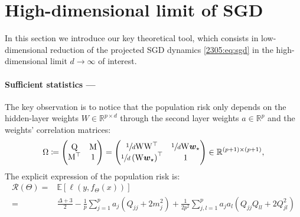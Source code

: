 \section{High-dimensional limit of SGD}

\label{2305:sec:odes}
In this section we introduce our key theoretical tool, which consists in low-dimensional reduction of the projected SGD dynamics \eqref{2305:eq:sgd} in the high-dimensional limit $d\to\infty$ of interest. 
\paragraph{Sufficient statistics ---} The key observation is to notice that the population risk only depends on the hidden-layer weights $W\in\mathbb{R}^{p\times d}$ through the second layer weights \(a\in\mathbb{R}^p\) and the weights' correlation matrices:
\begin{equation}\label{2305:eq:def:overlaps}
\begin{split}
\Omega\coloneqq
\begin{pmatrix}
\mathrm{Q}& \mathrm{M}\\
{\mathrm{M}^{\top}} & 1
\end{pmatrix}=
\begin{pmatrix}
\sfrac{1}{d}\mathrm{W}{\mathrm{W}}^{\top}& \sfrac{1}{d}\mathrm{W}{{\boldsymbol{w}}_\star}\\
\sfrac{1}{d}\left(\mathrm{W}{{\boldsymbol{w}}_\star}\right)^\top& 1
\end{pmatrix}
\in\mathbb{R}^{(p+1)\times (p+1)},
\end{split}
\end{equation}
The explicit expression of the population risk is:
\begin{equation}\label{2305:eq:def:risk}
    \begin{split}
        \mathcal{R}(\Theta) =& \mathbb{E}\left[\ell(y,f_{\Theta}(x))\right] \\ =& 
        \frac{\Delta+3}{2}- \frac{1}{p}\sum\limits_{j=1}^{p}a_{j}\left(Q_{jj}+2m_{j}^2\right)+\frac{1}{2p^2}\sum\limits_{j,l=1}^{p}a_{j}a_{l}(Q_{jj}Q_{ll}+2Q_{jl}^2)
    \end{split}
\end{equation}

